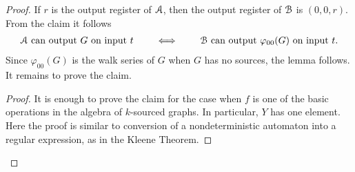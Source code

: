 \begin{proof}
        If $r$ is the output register of ${{\mathcal A}}$, then the output register of ${\mathcal B}$ is $(0,0,r)$.  From the claim it follows 
        \begin{align*}
        \text{${{\mathcal A}}$ can output $G$ on input $t$} \qquad \iff \qquad 
        \text{${\mathcal B}$ can output $\varphi_{00}(G)$ on input $t$}.
        \end{align*}
        Since $\varphi_{00}(G)$ is the walk series of $G$ when $G$ has no sources, the lemma follows. It remains to prove the claim.

        \begin{proof} 
            It is enough to prove the claim for the case when $f$ is one of the basic operations in the algebra of $k$-sourced graphs. In particular, $Y$ has one element. Here the proof is similar to conversion of a nondeterministic automaton into a regular expression, as in the Kleene Theorem.
            

\end{proof}
\end{proof}
